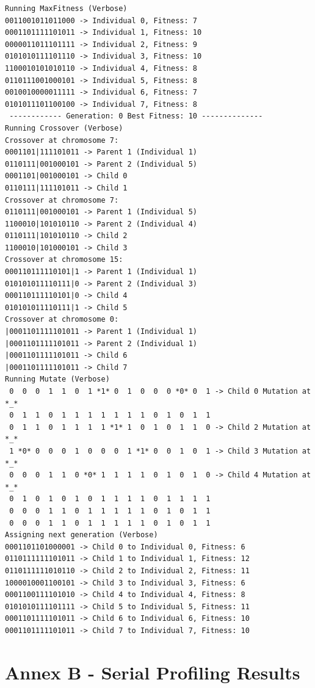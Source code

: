 \documentclass{report}
\begin{document}
\begin{lstlisting}
Running MaxFitness (Verbose)
0011001011011000 -> Individual 0, Fitness: 7
0001101111101011 -> Individual 1, Fitness: 10
0000011011101111 -> Individual 2, Fitness: 9
0101010111101110 -> Individual 3, Fitness: 10
1100010101010110 -> Individual 4, Fitness: 8
0110111001000101 -> Individual 5, Fitness: 8
0010010000011111 -> Individual 6, Fitness: 7
0101011101100100 -> Individual 7, Fitness: 8
 ------------ Generation: 0 Best Fitness: 10 --------------
Running Crossover (Verbose)
Crossover at chromosome 7:
0001101|111101011 -> Parent 1 (Individual 1)
0110111|001000101 -> Parent 2 (Individual 5)
0001101|001000101 -> Child 0
0110111|111101011 -> Child 1
Crossover at chromosome 7:
0110111|001000101 -> Parent 1 (Individual 5)
1100010|101010110 -> Parent 2 (Individual 4)
0110111|101010110 -> Child 2
1100010|101000101 -> Child 3
Crossover at chromosome 15:
000110111110101|1 -> Parent 1 (Individual 1)
010101011110111|0 -> Parent 2 (Individual 3)
000110111110101|0 -> Child 4
010101011110111|1 -> Child 5
Crossover at chromosome 0:
|0001101111101011 -> Parent 1 (Individual 1)
|0001101111101011 -> Parent 2 (Individual 1)
|0001101111101011 -> Child 6
|0001101111101011 -> Child 7
Running Mutate (Verbose)
 0  0  0  1  1  0  1 *1* 0  1  0  0  0 *0* 0  1 -> Child 0 Mutation at *_* 
 0  1  1  0  1  1  1  1  1  1  1  0  1  0  1  1 
 0  1  1  0  1  1  1  1 *1* 1  0  1  0  1  1  0 -> Child 2 Mutation at *_* 
 1 *0* 0  0  0  1  0  0  0  1 *1* 0  0  1  0  1 -> Child 3 Mutation at *_* 
 0  0  0  1  1  0 *0* 1  1  1  1  0  1  0  1  0 -> Child 4 Mutation at *_* 
 0  1  0  1  0  1  0  1  1  1  1  0  1  1  1  1 
 0  0  0  1  1  0  1  1  1  1  1  0  1  0  1  1 
 0  0  0  1  1  0  1  1  1  1  1  0  1  0  1  1 
Assigning next generation (Verbose)
0001101101000001 -> Child 0 to Individual 0, Fitness: 6
0110111111101011 -> Child 1 to Individual 1, Fitness: 12
0110111111010110 -> Child 2 to Individual 2, Fitness: 11
1000010001100101 -> Child 3 to Individual 3, Fitness: 6
0001100111101010 -> Child 4 to Individual 4, Fitness: 8
0101010111101111 -> Child 5 to Individual 5, Fitness: 11
0001101111101011 -> Child 6 to Individual 6, Fitness: 10
0001101111101011 -> Child 7 to Individual 7, Fitness: 10
\end{lstlisting}

\newpage
\section*{Annex B - Serial Profiling Results}
\end{document}
